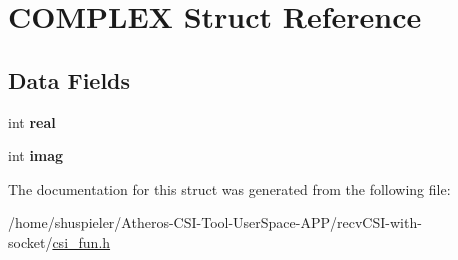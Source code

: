 \hypertarget{structCOMPLEX}{\section{C\+O\+M\+P\+L\+E\+X Struct Reference}
\label{structCOMPLEX}
}
\subsection*{Data Fields}
\begin{DoxyCompactItemize}
\item 
\hypertarget{structCOMPLEX_a102365412859377c432d9f5a0af670db}{int {\bfseries real}}\label{structCOMPLEX_a102365412859377c432d9f5a0af670db}

\item 
\hypertarget{structCOMPLEX_a794c97ac4d36c50108cb1de1345b7d5a}{int {\bfseries imag}}\label{structCOMPLEX_a794c97ac4d36c50108cb1de1345b7d5a}

\end{DoxyCompactItemize}


The documentation for this struct was generated from the following file\+:\begin{DoxyCompactItemize}
\item 
/home/shuspieler/\+Atheros-\/\+C\+S\+I-\/\+Tool-\/\+User\+Space-\/\+A\+P\+P/recv\+C\+S\+I-\/with-\/socket/\hyperlink{csi__fun_8h}{csi\+\_\+fun.\+h}\end{DoxyCompactItemize}
